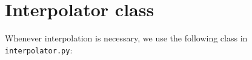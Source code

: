 \section{Interpolator class}
Whenever interpolation is necessary, we use the following class in \texttt{interpolator.py}:

